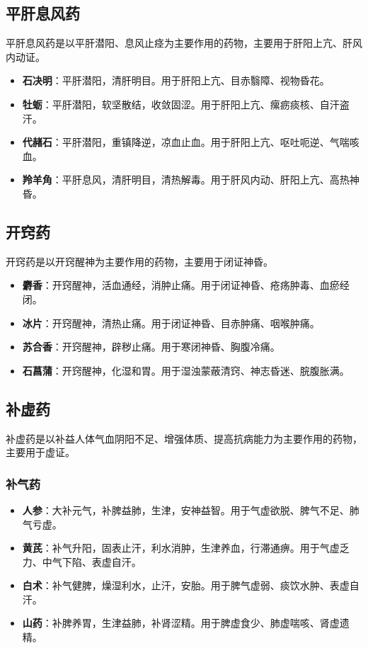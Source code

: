 \documentclass[12pt,UTF8]{ctexbook}
\begin{document}
\subsection{平肝息风药}

平肝息风药是以平肝潜阳、息风止痉为主要作用的药物，主要用于肝阳上亢、肝风内动证。

\begin{itemize}
\item \textbf{石决明}：平肝潜阳，清肝明目。用于肝阳上亢、目赤翳障、视物昏花。
\item \textbf{牡蛎}：平肝潜阳，软坚散结，收敛固涩。用于肝阳上亢、瘰疬痰核、自汗盗汗。
\item \textbf{代赭石}：平肝潜阳，重镇降逆，凉血止血。用于肝阳上亢、呕吐呃逆、气喘咳血。
\item \textbf{羚羊角}：平肝息风，清肝明目，清热解毒。用于肝风内动、肝阳上亢、高热神昏。
\end{itemize}

\subsection{开窍药}

开窍药是以开窍醒神为主要作用的药物，主要用于闭证神昏。

\begin{itemize}
\item \textbf{麝香}：开窍醒神，活血通经，消肿止痛。用于闭证神昏、疮疡肿毒、血瘀经闭。
\item \textbf{冰片}：开窍醒神，清热止痛。用于闭证神昏、目赤肿痛、咽喉肿痛。
\item \textbf{苏合香}：开窍醒神，辟秽止痛。用于寒闭神昏、胸腹冷痛。
\item \textbf{石菖蒲}：开窍醒神，化湿和胃。用于湿浊蒙蔽清窍、神志昏迷、脘腹胀满。
\end{itemize}

\subsection{补虚药}

补虚药是以补益人体气血阴阳不足、增强体质、提高抗病能力为主要作用的药物，主要用于虚证。

\subsubsection{补气药}

\begin{itemize}
\item \textbf{人参}：大补元气，补脾益肺，生津，安神益智。用于气虚欲脱、脾气不足、肺气亏虚。
\item \textbf{黄芪}：补气升阳，固表止汗，利水消肿，生津养血，行滞通痹。用于气虚乏力、中气下陷、表虚自汗。
\item \textbf{白术}：补气健脾，燥湿利水，止汗，安胎。用于脾气虚弱、痰饮水肿、表虚自汗。
\item \textbf{山药}：补脾养胃，生津益肺，补肾涩精。用于脾虚食少、肺虚喘咳、肾虚遗精。
\end{itemize}
\end{document}

